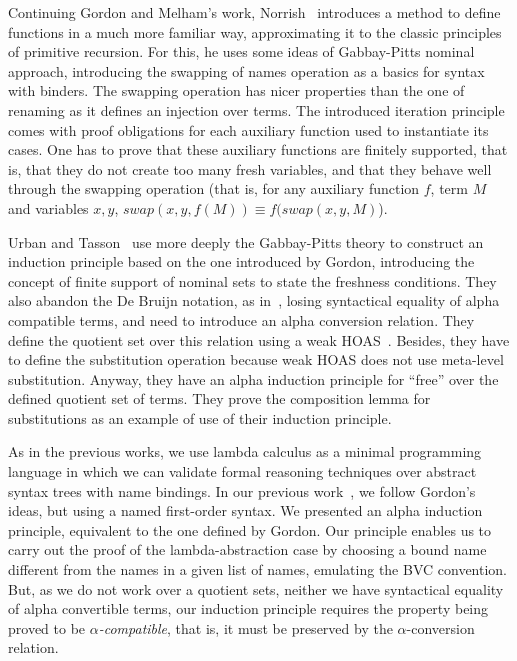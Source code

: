 \documentclass[preprint,10pt]{sigplanconf}
\newcommand{\alp}{\ensuremath{\alpha}}
\begin{document}
Continuing Gordon and Melham's work, Norrish~\cite{Norrish04recursivefunction} introduces a method to define functions in a much more familiar way, approximating it to the classic principles of primitive recursion. 
For this, he uses some ideas of Gabbay-Pitts nominal approach, introducing the swapping of names operation as a basics for syntax with binders. 
The swapping operation has nicer properties than the one of renaming as it defines an injection over terms. 
The introduced iteration principle comes with proof obligations for each auxiliary function used to instantiate its cases. 
One has to prove that these auxiliary functions are finitely supported, that is, that they do not create too many fresh variables, and that they behave well through the swapping operation (that is, for any auxiliary function $f$, term $M$ and variables $x , y$, $swap(x,y,f(M)) \equiv f(swap(x,y,M)$).

Urban and Tasson~\cite{urban05} use more deeply the Gabbay-Pitts theory to construct an induction principle based on the one introduced by Gordon,  introducing the concept of finite support of nominal sets to state the freshness conditions. 
They also abandon the De Bruijn notation, as in~\cite{DBLP:conf/tphol/GordonM96}, losing syntactical equality of alpha compatible terms, and need to introduce an alpha conversion relation. 
They define the quotient set over this relation using a weak HOAS~\cite{DespeyrouxFH95}. 
Besides, they have to define the substitution operation because weak HOAS does not use meta-level substitution.
Anyway, they have an alpha induction principle for ``free'' over the defined quotient set of terms. 
They prove the composition lemma for substitutions %
as an example of use of their induction principle. 

As in the previous works, we use lambda calculus as a minimal programming language in which we can validate formal reasoning techniques over abstract syntax trees with name bindings. 
In our previous work~\cite{CopelloTSBF16}, we follow Gordon's ideas, but using a named first-order syntax.  
We presented  an alpha induction principle, equivalent to the  one defined by Gordon. 
Our principle enables us to carry out the proof of the lambda-abstraction case by choosing a bound name different from the names in a given list of names, emulating the BVC convention. But, as we do not work over a quotient sets, neither we have syntactical equality of alpha convertible terms, our induction principle requires the property being proved  to be \emph{\alp-compatible}, that is, it must be preserved by the \alp-conversion relation. 
\end{document}

